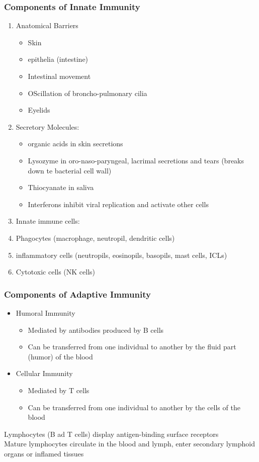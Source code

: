 \begin{itemize}
\begin{itemize}
\subsubsection{Components of Innate Immunity}
\begin{enumerate}
    \item Anatomical Barriers
    \begin{itemize}
        \item Skin
        \item epithelia (intestine)
        \item Intestinal movement
        \item OScillation of broncho-pulmonary cilia
        \item Eyelids
    \end{itemize}
    \item Secretory Molecules:
    \begin{itemize}
        \item organic acids in skin secretions
        \item Lysozyme in oro-naso-paryngeal, lacrimal secretions and tears (breaks down te bacterial cell wall)
        \item Thiocyanate in saliva
        \item Interferons inhibit viral replication and activate other cells
    \end{itemize}
    \item Innate immune cells:
    \item Phagocytes (macrophage, neutropil, dendritic cells)
    \item inflammatory cells (neutropils, eosinopils, basopils, mast cells, ICLs)
    \item Cytotoxic cells (NK cells)
\end{enumerate}
\subsubsection{Components of Adaptive Immunity}
\begin{itemize}
    \item Humoral Immunity
    \begin{itemize}
        \item Mediated by antibodies produced by B cells
        \item Can be transferred from one individual to another by the fluid part (humor) of the blood
    
    \end{itemize}
    \item Cellular Immunity
    \begin{itemize}
        \item Mediated by T cells
        \item Can be transferred from one individual to another by the cells of the blood
    \end{itemize}
\end{itemize}
Lymphocytes (B ad T cells) display antigen-binding surface receptors
\\Mature lymphocytes circulate in the blood and lymph, enter secondary lymphoid organs or inflamed tissues


\end{itemize}
\end{itemize}
